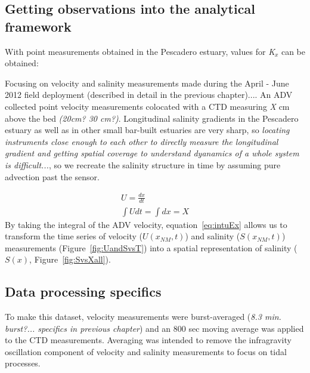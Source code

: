\subsection{Getting observations into the analytical framework} \label{ssec:ObsInto1DAdvDiff}


With point measurements obtained in the Pescadero estuary, values for \emph{K$_x$} can be obtained: 

Focusing on velocity and salinity measurements made during the April - June 2012 field deployment (described in detail in the previous chapter).... An ADV collected point velocity measurements colocated with a CTD measuring \emph{X} cm above the bed \emph{(20cm? 30 cm?)}. Longitudinal salinity gradients in the Pescadero estuary as well as in other small bar-built estuaries are very sharp, so \emph{locating instruments close enough to each other to directly measure the longitudinal gradient and getting spatial coverage to understand dyanamics of a whole system is difficult...}, so we recreate the salinity structure in time by assuming pure advection past the sensor. 

\begin{eqnarray}
U = \frac{dx}{dt} \label{eq:uEdxdt}\\
\int{Udt} = \int{dx} = X \label{eq:intuEx}
\end{eqnarray}
By taking the integral of the ADV velocity, equation~\ref{eq:intuEx} allows us to transform the time series of velocity ($U(x_{NM},t)$) and salinity ($S(x_{NM},t)$) measurements (Figure~\ref{fig:UandSvsT}) into a spatial representation of salinity ($S(x)$, Figure~\ref{fig:SvsXall}).

\subsection{Data processing specifics} \label{ssec:DataProcessing}
To make this dataset, velocity measurements were burst-averaged (\emph{8.3 min. burst?... specifics in previous chapter}) and an 800 sec moving average was applied to the CTD measurements.  Averaging was intended to remove the infragravity oscillation component of velocity and salinity measurements to focus on tidal processes. 

